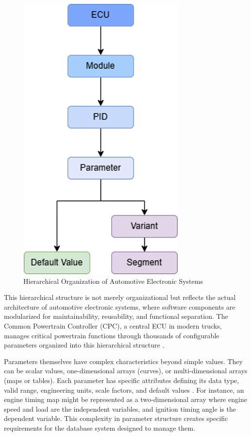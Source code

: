 \begin{figure}[ht]
    \centering
    \includegraphics[height=0.4\textheight]{figures/ecu_hierarchy.png}
    \caption{Hierarchical Organization of Automotive Electronic Systems}
    \label{fig:ecu-hierarchy}
\end{figure}

This hierarchical structure is not merely organizational but reflects the actual architecture of automotive electronic systems, where software components are modularized for maintainability, reusability, and functional separation. The Common Powertrain Controller (CPC), a central \ac{ECU} in modern trucks, manages critical powertrain functions through thousands of configurable parameters organized into this hierarchical structure \cite{staron2021automotive}.

Parameters themselves have complex characteristics beyond simple values. They can be scalar values, one-dimensional arrays (curves), or multi-dimensional arrays (maps or tables). Each parameter has specific attributes defining its data type, valid range, engineering units, scale factors, and default values \cite{pretschner2007software}. For instance, an engine timing map might be represented as a two-dimensional array where engine speed and load are the independent variables, and ignition timing angle is the dependent variable. This complexity in parameter structure creates specific requirements for the database system designed to manage them.

